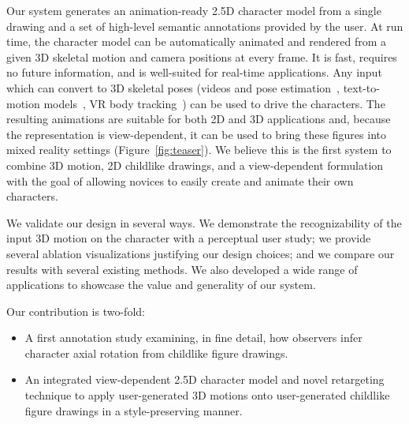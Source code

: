 Our system generates an animation-ready 2.5D character model from a single drawing and a set of high-level semantic annotations provided by the user. At run time, the character model can be automatically animated and rendered from a given 3D skeletal motion and camera positions at every frame. It is fast, requires no future information, and is well-suited for real-time applications. Any input which can convert to 3D skeletal poses (videos and pose estimation~\cite{li2021hybrik}, text-to-motion models~\cite{jiang2023motiongpt}, VR body tracking~\cite{10.1145/3550469.3555411, jiang22avatarposer}) can be used to drive the characters. The resulting animations are suitable for both 2D and 3D applications and, because the representation is view-dependent, it can be used to bring these figures into mixed reality settings (Figure~\ref{fig:teaser}). We believe this is the first system to combine 3D motion, 2D childlike drawings, and a view-dependent formulation with the goal of allowing novices to easily create and animate their own characters. %

We validate our design in several ways. We demonstrate the recognizability of the input 3D motion on the character with a perceptual user study; we provide several ablation visualizations justifying our design choices; and we compare our results with several existing methods. We also developed a wide range of applications to showcase the value and generality of our system.

Our contribution is two-fold: 
\begin{itemize}
    \item A first annotation study examining, in fine detail, how observers infer character axial rotation from childlike figure drawings. 
    \item An integrated view-dependent 2.5D character model and novel retargeting technique to apply user-generated 3D motions onto user-generated childlike figure drawings in a style-preserving manner.
\end{itemize}














